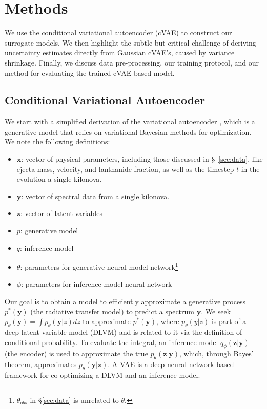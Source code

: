 \documentclass[fleqn,usenatbib,useAMS]{mnras}
\begin{document}
\section{Methods}
\label{sec:method}

We use the conditional variational autoencoder (cVAE) to construct our surrogate models. 
We then highlight the subtle but critical challenge of deriving uncertainty estimates directly from Gaussian cVAE's, caused by variance shrinkage. 
Finally, we discuss data pre-processing, our training protocol, and our method for evaluating the trained cVAE-based model.

\subsection{Conditional Variational Autoencoder}
We start with a simplified derivation of the variational autoencoder \citep[VAE;][]{kingmaAutoEncodingVariationalBayes2014}, which is a generative model that relies on variational Bayesian methods for optimization.
We note the following definitions:

\begin{itemize}
\item $\boldsymbol{x}$: vector of physical parameters, including those discussed in \S~\ref{sec:data}, like ejecta mass, velocity, and lanthanide fraction, as well as the timestep $t$ in the evolution a single kilonova.
\item $\boldsymbol{y}$: vector of spectral data from a single kilonova.
\item $\boldsymbol{z}$: vector of latent variables
\item $p$: generative model
\item $q$: inference model
\item $\theta$: parameters for generative neural model network\footnote{$\theta_{obs}$ in \S\ref{sec:data} is unrelated to $\theta$.}
\item $\phi$: parameters for inference model neural network
\end{itemize}


Our goal is to obtain a model to efficiently approximate a generative process $p^{*}(\boldsymbol{y})$ (the radiative transfer model) to predict a spectrum $\boldsymbol{y}$.
We seek $p_{\theta}(\boldsymbol{y}) = \int p_{\theta}(\boldsymbol{y}|z) dz$ to approximate $p^{*}(\boldsymbol{y})$, where $p_{\theta}(y|z)$ is part of a deep latent variable model (DLVM) and is related to it via the definition of conditional probability.
To evaluate the integral, an inference model $q_{\phi}(\mathbf{z} | \mathbf{y})$ (the encoder) is used to approximate the true $p_{\theta} (\mathbf{z} | \mathbf{y})$, which, through Bayes' theorem, approximates $p_{\theta}(\mathbf{y} | \mathbf{z})$.
A VAE is a deep neural network-based framework for co-optimizing a DLVM and an inference model.
\end{document}
